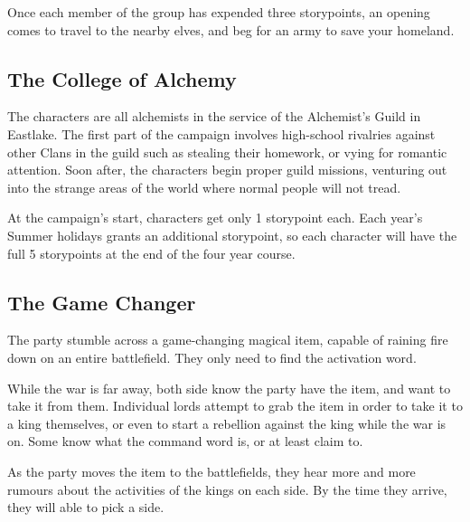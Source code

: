 {\begin{multicols}{2}
Once each member of the group has expended three \glspl{storypoint}, an opening comes to travel to the nearby elves, and beg for an army to save your homeland.

\subsection{The College of Alchemy}

The characters are all alchemists in the service of the Alchemist's Guild in Eastlake.
The first part of the campaign involves high-school rivalries against other Clans in the guild such as stealing their homework, or vying for romantic attention.
Soon after, the characters begin proper guild missions, venturing out into the strange areas of the world where normal people will not tread.

At the campaign's start, characters get only 1 \gls{storypoint} each.
Each year's Summer holidays grants an additional \gls{storypoint}, so each character will have the full 5 \glspl{storypoint} at the end of the four year course.

\subsection{The Game Changer}

The party stumble across a game-changing magical item, capable of raining fire down on an entire battlefield.
They only need to find the activation word.

While the war is far away, both side know the party have the item, and want to take it from them.
Individual lords attempt to grab the item in order to take it to a king themselves, or even to start a rebellion against the king while the war is on.
Some know what the command word is, or at least claim to.

As the party moves the item to the battlefields, they hear more and more rumours about the activities of the kings on each side.
By the time they arrive, they will able to pick a side.

\end{multicols}

}{}

